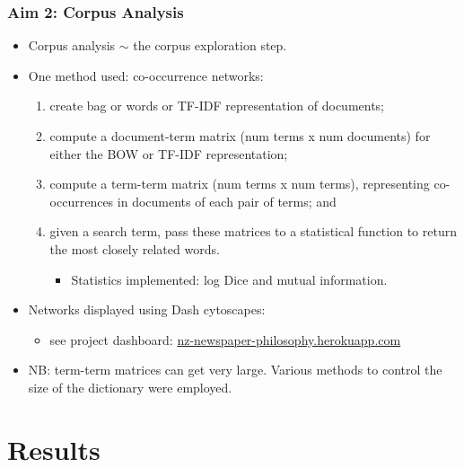 \documentclass[10pt, compress]{beamer}
\begin{document}
\begin{frame}
	\frametitle{Aim 2: Corpus Analysis}

	\pause

  \begin{itemize}[<+- | alert@+>]
		\item Corpus analysis $\sim$ the corpus exploration step.
		\item One method used: co-occurrence networks:
		\begin{enumerate}
			\item create bag or words or TF-IDF representation of documents;
			\item compute a document-term matrix (num terms x num documents) for either the BOW or TF-IDF representation;
			\item compute a term-term matrix (num terms x num terms), representing co-occurrences in documents of each pair of terms; and
			\item given a search term, pass these matrices to a statistical function to return the most closely related words.
			\begin{itemize}
				\item Statistics implemented: log Dice and mutual information.
			\end{itemize}
		\end{enumerate}
		\item Networks displayed using Dash cytoscapes:
		\begin{itemize}
		\item see project dashboard: \url{nz-newspaper-philosophy.herokuapp.com}
		\end{itemize}
		\item NB: term-term matrices can get very large. Various methods to control the size of the dictionary were employed.
	\end{itemize}

\end{frame}

\section{Results}
\end{document}
